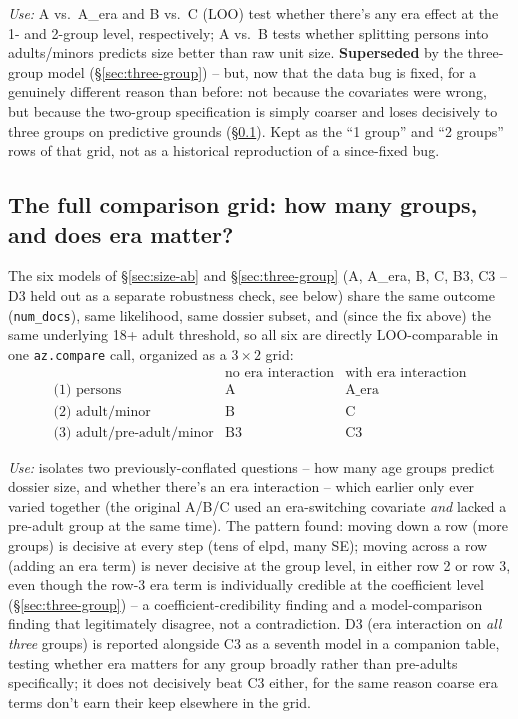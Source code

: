 \textit{Use:} A vs.\ A\_era and B vs.\ C (LOO) test whether there's any era
effect at the 1- and 2-group level, respectively; A vs.\ B tests whether
splitting persons into adults/minors predicts size better than raw unit
size. \textbf{Superseded} by the three-group model (\S\ref{sec:three-group})
-- but, now that the data bug is fixed, for a genuinely different reason
than before: not because the covariates were wrong, but because the
two-group specification is simply coarser and loses decisively to three
groups on predictive grounds (\S\ref{sec:grid}). Kept as the ``1 group''
and ``2 groups'' rows of that grid, not as a historical reproduction of a
since-fixed bug.

\subsection{The full comparison grid: how many groups, and does era matter?}
\label{sec:grid}

The six models of \S\ref{sec:size-ab} and \S\ref{sec:three-group} (A,
A\_era, B, C, B3, C3 -- D3 held out as a separate robustness check, see
below) share the same outcome (\texttt{num\_docs}), same likelihood, same
dossier subset, and (since the fix above) the same underlying 18+ adult
threshold, so all six are directly LOO-comparable in one \texttt{az.compare}
call, organized as a $3\times2$ grid:
\[
\begin{array}{lll}
  & \text{no era interaction} & \text{with era interaction} \\
  \text{(1) persons} & \text{A} & \text{A\_era} \\
  \text{(2) adult/minor} & \text{B} & \text{C} \\
  \text{(3) adult/pre-adult/minor} & \text{B3} & \text{C3}
\end{array}
\]

\textit{Use:} isolates two previously-conflated questions -- how many age
groups predict dossier size, and whether there's an era interaction --
which earlier only ever varied together (the original A/B/C used an
era-switching covariate \emph{and} lacked a pre-adult group at the same
time). The pattern found: moving down a row (more groups) is decisive at
every step (tens of elpd, many SE); moving across a row (adding an era
term) is never decisive at the group level, in either row 2 or row 3, even
though the row-3 era term is individually credible at the coefficient level
(\S\ref{sec:three-group}) -- a coefficient-credibility finding and a
model-comparison finding that legitimately disagree, not a contradiction.
D3 (era interaction on \emph{all three} groups) is reported alongside C3 as
a seventh model in a companion table, testing whether era matters for any
group broadly rather than pre-adults specifically; it does not decisively
beat C3 either, for the same reason coarse era terms don't earn their keep
elsewhere in the grid.

